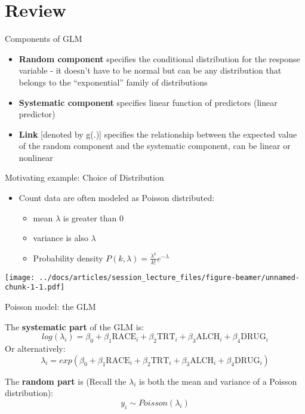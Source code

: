 \documentclass[
  ignorenonframetext,
]{beamer}
\providecommand{\tightlist}{%
  \setlength{\itemsep}{0pt}\setlength{\parskip}{0pt}}
\begin{document}
\hypertarget{review}{%
\section{Review}\label{review}}

\begin{frame}{Components of GLM}
\protect\hypertarget{components-of-glm}{}

\begin{itemize}
\tightlist
\item
  \textbf{Random component} specifies the conditional distribution for
  the response variable - it doesn't have to be normal but can be any
  distribution that belongs to the ``exponential'' family of
  distributions
\item
  \textbf{Systematic component} specifies linear function of predictors
  (linear predictor)
\item
  \textbf{Link} {[}denoted by g(.){]} specifies the relationship between
  the expected value of the random component and the systematic
  component, can be linear or nonlinear
\end{itemize}

\end{frame}

\begin{frame}{Motivating example: Choice of Distribution}
\protect\hypertarget{motivating-example-choice-of-distribution}{}

\begin{itemize}
\tightlist
\item
  Count data are often modeled as Poisson distributed:

  \begin{itemize}
  \tightlist
  \item
    mean \(\lambda\) is greater than 0
  \item
    variance is also \(\lambda\)
  \item
    Probability density
    \(P(k, \lambda) = \frac{\lambda^k}{k!} e^{-\lambda}\)
  \end{itemize}
\end{itemize}

\texttt{[image: ../docs/articles/session\_lecture\_files/figure-beamer/unnamed-chunk-1-1.pdf]}

\end{frame}

\begin{frame}{Poisson model: the GLM}
\protect\hypertarget{poisson-model-the-glm}{}

The \textbf{systematic part} of the GLM is: \[
log(\lambda_i) = \beta_0 + \beta_1 \textrm{RACE}_i + \beta_2 \textrm{TRT}_i + \beta_3 \textrm{ALCH}_i + \beta_4 \textrm{DRUG}_i
\] Or alternatively: \[
\lambda_i = exp \left( \beta_0 + \beta_1 \textrm{RACE}_i + \beta_2 \textrm{TRT}_i + \beta_3 \textrm{ALCH}_i + \beta_4 \textrm{DRUG}_i \right)
\]

The \textbf{random part} is (Recall the \(\lambda_i\) is both the mean
and variance of a Poisson distribution): \[
y_i \sim Poisson(\lambda_i)
\]

\end{frame}
\end{document}
